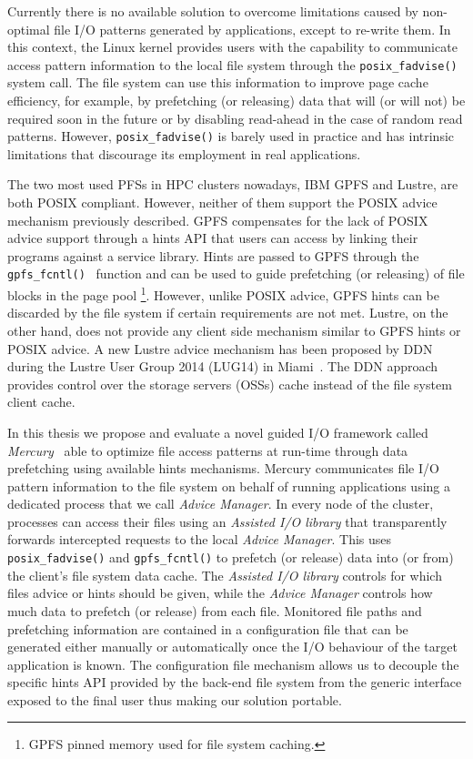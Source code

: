 Currently there is no available solution to overcome limitations caused by non-optimal file I/O patterns generated by applications, except to re-write them. In this context, the Linux kernel provides users with the capability to communicate access 
pattern information to the local file system through the \texttt{posix\_fadvise()}~\cite{AdviseAPI} system call. The file system can use this information to improve page cache efficiency, for example, by prefetching (or releasing) data that will 
(or will not) be required soon in the future or by disabling read-ahead in the case of random read patterns. However, \texttt{posix\_fadvise()} is barely used in practice and has intrinsic limitations that discourage its employment in real applications.

The two most used PFSs in HPC clusters nowadays, IBM GPFS and Lustre, are both POSIX compliant. However, neither of them support the POSIX advice mechanism previously described. GPFS compensates for the lack of POSIX advice support through a hints API 
that users can access by linking their programs against a service library. Hints are passed to GPFS through the \texttt{gpfs\_fcntl()}~\cite{GPFSHINTS} function and can be used to guide prefetching (or releasing) of file blocks in the page pool
\footnote{GPFS pinned memory used for file system caching.}. However, unlike POSIX advice, GPFS hints can be discarded by the file system if certain requirements are not met. Lustre, on the other hand, does not provide any client side mechanism similar 
to GPFS hints or POSIX advice. A new Lustre advice mechanism has been proposed by DDN during the Lustre User Group 2014 (LUG14) in Miami~\cite{Comer14}. The DDN approach provides control over the storage servers (OSSs) cache instead of the file 
system client cache.

In this thesis we propose and evaluate a novel guided I/O framework called \textit{Mercury}~\cite{mercury} able to optimize file access patterns at run-time through data prefetching using available hints mechanisms. Mercury communicates file I/O pattern 
information to the file system on behalf of running applications using a dedicated process that we call \textit{Advice Manager}. In every node of the cluster, processes can access their files using an \textit{Assisted I/O library} that transparently 
forwards intercepted requests to the local \textit{Advice Manager}. This uses \texttt{posix\_fadvise()} and \texttt{gpfs\_fcntl()} to prefetch (or release) data into (or from) the client's file system data cache. The \textit{Assisted I/O library} controls 
for which files advice or hints should be given, while the \textit{Advice Manager} controls how much data to prefetch (or release) from each file. Monitored file paths and prefetching information are contained in a configuration file that can be generated 
either manually or automatically once the I/O behaviour of the target application is known. The configuration file mechanism allows us to decouple the specific hints API provided by the back-end file system from the generic interface exposed to the final 
user thus making our solution portable.

